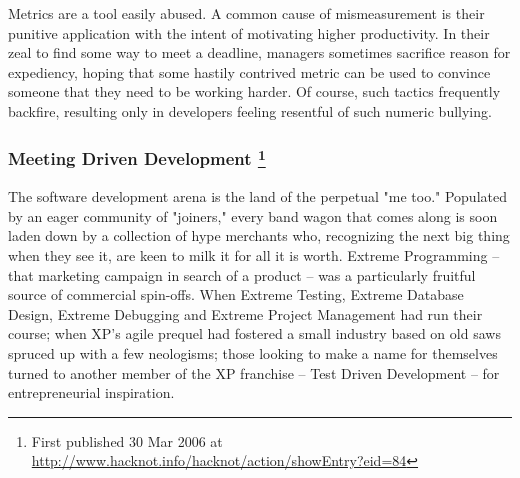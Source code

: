 \documentclass{article}
\begin{document}
\begin{enumerate}
Metrics are a tool easily abused. A common cause of mismeasurement is
their punitive application with the intent of motivating higher
productivity. In their zeal to find some way to meet a deadline,
managers sometimes sacrifice reason for expediency, hoping that some
hastily contrived metric can be used to convince someone that they need
to be working harder. Of course, such tactics frequently backfire,
resulting only in developers feeling resentful of such numeric bullying.
\end{enumerate}

\subsubsection{Meeting Driven Development  \footnote{First published 30 Mar 2006 at
\url{http://www.hacknot.info/hacknot/action/showEntry?eid=84}}}
\label{sec:orgheadline188}

The software development arena is the land of the perpetual "me too."
Populated by an eager community of "joiners," every band wagon that
comes along is soon laden down by a collection of hype merchants who,
recognizing the next big thing when they see it, are keen to milk it for
all it is worth. Extreme Programming -- that marketing campaign in
search of a product -- was a particularly fruitful source of commercial
spin-offs. When Extreme Testing, Extreme Database Design, Extreme
Debugging and Extreme Project Management had run their course; when XP's
agile prequel had fostered a small industry based on old saws spruced up
with a few neologisms; those looking to make a name for themselves
turned to another member of the XP franchise -- Test Driven Development
-- for entrepreneurial inspiration.
\end{document}
